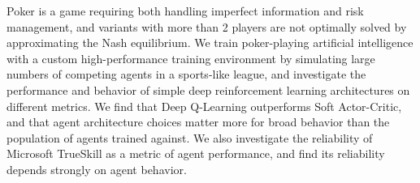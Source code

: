 Poker is a game requiring both handling imperfect information and risk management, and variants with more than 2 players are not optimally solved by approximating the Nash equilibrium. We train poker-playing artificial intelligence with a custom high-performance training environment by simulating large numbers of competing agents in a sports-like league, and investigate the performance and behavior of simple deep reinforcement learning architectures on different metrics. We find that Deep Q-Learning outperforms Soft Actor-Critic, and that agent architecture choices matter more for broad behavior than the population of agents trained against. We also investigate the reliability of Microsoft TrueSkill as a metric of agent performance, and find its reliability depends strongly on agent behavior.